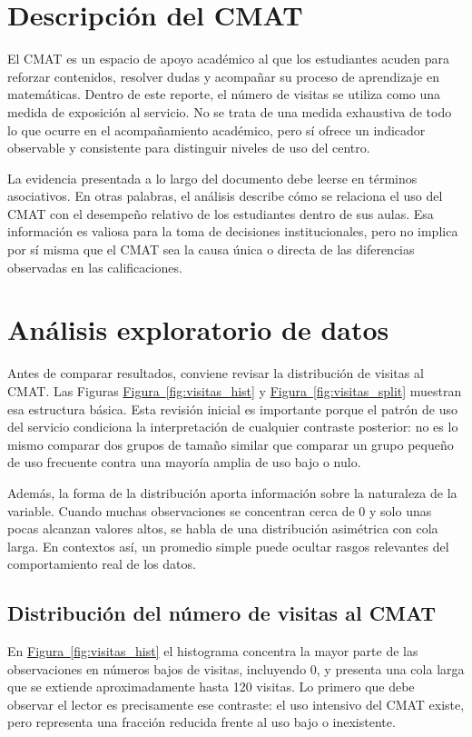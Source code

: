 \documentclass[8pt,a4paper]{article} %
\numberwithin{figure}{subsection}
\begin{document}
\FloatBarrier
\newpage
\section{Descripción del CMAT}
El CMAT es un espacio de apoyo académico al que los estudiantes acuden para reforzar contenidos, resolver dudas y acompañar su proceso de aprendizaje en matemáticas. Dentro de este reporte, el número de visitas se utiliza como una medida de exposición al servicio. No se trata de una medida exhaustiva de todo lo que ocurre en el acompañamiento académico, pero sí ofrece un indicador observable y consistente para distinguir niveles de uso del centro.

La evidencia presentada a lo largo del documento debe leerse en términos asociativos. En otras palabras, el análisis describe cómo se relaciona el uso del CMAT con el desempeño relativo de los estudiantes dentro de sus aulas. Esa información es valiosa para la toma de decisiones institucionales, pero no implica por sí misma que el CMAT sea la causa única o directa de las diferencias observadas en las calificaciones.



\FloatBarrier
\newpage
\section{Análisis exploratorio de datos}

Antes de comparar resultados, conviene revisar la distribución de visitas al CMAT. Las Figuras \hyperref[fig:visitas_hist]{Figura~\ref{fig:visitas_hist}} y \hyperref[fig:visitas_split]{Figura~\ref{fig:visitas_split}} muestran esa estructura básica. Esta revisión inicial es importante porque el patrón de uso del servicio condiciona la interpretación de cualquier contraste posterior: no es lo mismo comparar dos grupos de tamaño similar que comparar un grupo pequeño de uso frecuente contra una mayoría amplia de uso bajo o nulo.

Además, la forma de la distribución aporta información sobre la naturaleza de la variable. Cuando muchas observaciones se concentran cerca de 0 y solo unas pocas alcanzan valores altos, se habla de una distribución asimétrica con cola larga. En contextos así, un promedio simple puede ocultar rasgos relevantes del comportamiento real de los datos.

\subsection{Distribución del número de visitas al CMAT}
En \hyperref[fig:visitas_hist]{Figura~\ref{fig:visitas_hist}} el histograma concentra la mayor parte de las observaciones en números bajos de visitas, incluyendo 0, y presenta una cola larga que se extiende aproximadamente hasta 120 visitas. Lo primero que debe observar el lector es precisamente ese contraste: el uso intensivo del CMAT existe, pero representa una fracción reducida frente al uso bajo o inexistente.
\end{document}
